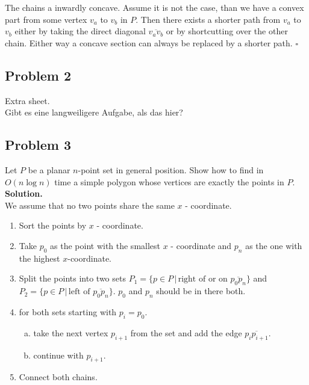 \documentclass[11pt,a4paper,ngerman]{article}
\begin{document}
\begin{enumerate}[(i)]
        The chains a inwardly concave. Assume it is not the case, than we have a convex part from some vertex $v_a$ to $v_b$ in $P$. Then
        there exists a shorter path from $v_a$ to $v_b$ either by taking the direct diagonal $\overline{v_a v_b}$ or by shortcutting over
        the other chain. Either way a concave section can always be replaced by a shorter path.
        \mbox{} \hfill $\square$
\end{enumerate}

\subsection*{Problem 2}

Extra sheet.\\

Gibt es eine langweiligere Aufgabe, als das hier?

\subsection*{Problem 3}

Let $P$ be a planar $n$-point set in general position. Show how to find in $O(n \log n)$ time a simple polygon
whose vertices are exactly the points in $P$.\\

\textbf{Solution.}\\

We assume that no two points share the same $x$ - coordinate.

\begin{enumerate}[1.]
    \item Sort the points by $x$ - coordinate.
    \item Take $p_0$ as the point with the smallest $x$ - coordinate and $p_n$ as the one with
        the highest $x$-coordinate.
    \item Split the points into two sets $P_1 = \{ p \in P \, | \, \text{right of or on } \overline{p_0 p_n} \}$
        and $P_2 = \{ p \in P \, | \, \text{left of } \overline{p_0 p_n} \}$. $p_0$ and $p_n$ should be in there both.
    \item for both sets starting with $p_i = p_0$.
        \begin{enumerate}[a.]
            \item take the next vertex $p_{i+1}$ from the set and add the
                edge $\overline{p_ip_{i+1}}$.
            \item continue with $p_{i+1}$.
        \end{enumerate}
    \item Connect both chains.
\end{enumerate}
\end{document}
